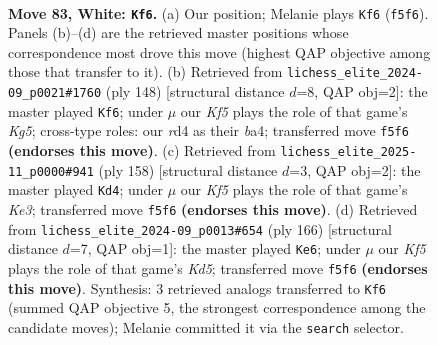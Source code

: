 \documentclass[11pt]{article}
\begin{document}
\clearpage

\begin{figure}[p]\centering
\begin{subfigure}{0.46\textwidth}\centering
\resizebox{\linewidth}{!}{%
\newchessgame
\chessboard[
  setfen={8/8/k7/5K2/3r4/1R6/1N4P1/8 w - - 30 83},
  showmover=false,
  pgfstyle=straightmove, color=movearrow, markmove={f5-f6}
]}
\caption{}
\end{subfigure}\hfill
\begin{subfigure}{0.46\textwidth}\centering
\resizebox{\linewidth}{!}{%
\newchessgame
\chessboard[
  setfen={6k1/8/4R3/4N1K1/b7/8/8/8 w - - 20 75},
  showmover=false,
  pgfstyle=straightmove, color=movearrow, markmove={g5-f6}
]}
\caption{}
\end{subfigure}
\\[4pt]
\begin{subfigure}{0.46\textwidth}\centering
\resizebox{\linewidth}{!}{%
\newchessgame
\chessboard[
  setfen={8/8/8/5k2/8/R1N1K3/1r6/8 w - - 1 80},
  showmover=false,
  pgfstyle=straightmove, color=movearrow, markmove={e3-d4}
]}
\caption{}
\end{subfigure}\hfill
\begin{subfigure}{0.46\textwidth}\centering
\resizebox{\linewidth}{!}{%
\newchessgame
\chessboard[
  setfen={4k3/1R6/8/3KN3/8/8/8/2r5 w - - 41 84},
  showmover=false,
  pgfstyle=straightmove, color=movearrow, markmove={d5-e6}
]}
\caption{}
\end{subfigure}
\caption{\textbf{Move 83, White: \texttt{Kf6}.} (a) Our position; Melanie plays \texttt{Kf6} (\texttt{f5f6}). Panels (b)--(d) are the retrieved master positions whose correspondence most drove this move (highest QAP objective among those that transfer to it). (b) Retrieved from \texttt{lichess\_elite\_2024-09\_p0021\#1760} (ply 148) [structural distance $d$=8, QAP obj=2]: the master played \texttt{Kf6}; under $\mu$ our \emph{Kf5} plays the role of that game's \emph{Kg5}; cross-type roles: our \emph{r}d4 as their \emph{b}a4; transferred move \texttt{f5f6} \textbf{(endorses this move)}. (c) Retrieved from \texttt{lichess\_elite\_2025-11\_p0000\#941} (ply 158) [structural distance $d$=3, QAP obj=2]: the master played \texttt{Kd4}; under $\mu$ our \emph{Kf5} plays the role of that game's \emph{Ke3}; transferred move \texttt{f5f6} \textbf{(endorses this move)}. (d) Retrieved from \texttt{lichess\_elite\_2024-09\_p0013\#654} (ply 166) [structural distance $d$=7, QAP obj=1]: the master played \texttt{Ke6}; under $\mu$ our \emph{Kf5} plays the role of that game's \emph{Kd5}; transferred move \texttt{f5f6} \textbf{(endorses this move)}. Synthesis: 3 retrieved analogs transferred to \texttt{Kf6} (summed QAP objective 5, the strongest correspondence among the candidate moves); Melanie committed it via the \texttt{search} selector.}
\label{fig:thought-m164}
\end{figure}
\end{document}
